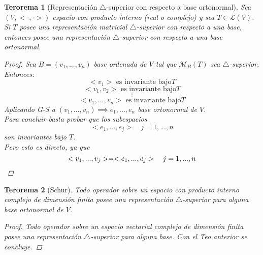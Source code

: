 \documentclass[11pt]{book}
\newtheorem{thm}{Terorema}[section]
\theoremstyle{definition}
\begin{document}
\begin{thm}[Representación $\triangle$-superior con respecto a base ortonormal]
	Sea $(V,<\cdot,\cdot>)$ espacio con producto interno (real o complejo) y sea $T\in\mathcal{L}(V)$. Si $T$ posee una representación matricial $\triangle$-superior con respecto a una base, entonces posee una representación $\triangle$-superior con respecto a una base ortonormal.
	\begin{proof}
		Sea $B=(v_1,...,v_n)$ base ordenada de $V$ tal que $\mathcal{M}_B(T)$ sea $\triangle$-superior. Entonces:
		\[<v_1>\textrm{ es invariante bajo} T\]
		\[<v_1,v_2>\textrm{ es invariante bajo} T\]
		\[\vdots\]
		\[<v_1,...,v_n>\textrm{ es invariante bajo} T\]
		Aplicando G-S a $(v_1,...,v_n)\implies e_1,...,e_n$ base ortonormal de $V$.\\
		Para concluir basta probar que los subespacios
		\[<e_1,...,e_j>\quad j=1,...,n\]
		son invariantes bajo $T$.\\
		Pero esto es directo, ya que
		\[<v_1,...,v_j>=<e_1,...,e_j>\quad j=1,...,n\qedhere\]
	\end{proof}
\end{thm}
\begin{thm}[Schur]
	Todo operador sobre un espacio con producto interno complejo de dimensión finita posee una representación $\triangle$-superior para alguna base ortonormal de $V$.
	\begin{proof}
		Todo operador sobre un espacio vectorial complejo de dimensión finita posee una representación $\triangle$-superior para alguna base. Con el Teo anterior se concluye.
	\end{proof}
\end{thm}
\end{document}
